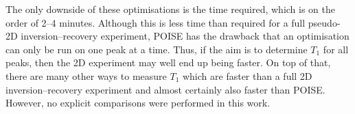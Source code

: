 The only downside of these optimisations is the time required, which is on the order of 2--4 minutes.
Although this is less time than required for a full pseudo-2D inversion--recovery experiment, POISE has the drawback that an optimisation can only be run on one peak at a time.
Thus, if the aim is to determine $T_1$ for all peaks, then the 2D experiment may well end up being faster.
On top of that, there are many other ways to measure $T_1$ which are faster than a full 2D inversion--recovery experiment and almost certainly also faster than POISE.\autocite{Christensen1974JPC,Homer1985JMR,Loening2003JMR,Smith2013CPC,Wei2021JOC}
However, no explicit comparisons were performed in this work.

